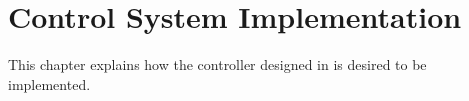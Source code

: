 \chapter{Control System Implementation}
\label{implementation_of_controller}

This chapter explains how the controller designed in  is desired to be implemented.  

